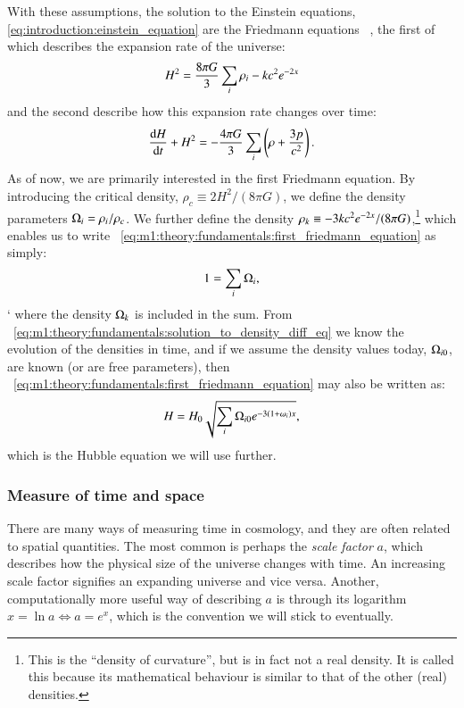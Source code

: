     With these assumptions, the solution to the Einstein equations, \cref{eq:introduction:einstein_equation} are the Friedmann equations ~\cite[ch. 8.3]{carroll_2019}, the first of which describes the expansion rate of the universe:
    \begin{equation}
        \label{eq:m1:theory:fundamentals:first_friedmann_equation}
        H^2 = \frac{8\pi G}{3}\sum_i\rho_i - kc^2e^{-2x} \\
    \end{equation}
    and the second describe how this expansion rate changes over time:
    \begin{equation}
        \label{eq:m1:theory:fundamentals:second_friedmann_equation}
        \dv{H}{t}+H^2 = -\frac{4\pi G}{3}\sum_i\left(\rho+\frac{3p}{c^2}\right).
    \end{equation}
    As of now, we are primarily interested in the first Friedmann equation. By introducing the critical density, $\rho_c\equiv2H^2/(8\pi G)$, we define the density parameters $\Omega_i=\rho_i/\rho_c$. We further define the density $\rho_k\equiv-3kc^2e^{-2x}/(8\pi G)$,\footnote{This is the ``density of curvature'', but is in fact not a real density. It is called this because its mathematical behaviour is similar to that of the other (real) densities.} which enables us to write ~\cref{eq:m1:theory:fundamentals:first_friedmann_equation} as simply:
    \begin{equation}
        1=\sum_i\Omega_i,
    \end{equation}`
    where the density $\Omega_k$ is included in the sum. From ~\cref{eq:m1:theory:fundamentals:solution_to_density_diff_eq} we know the evolution of the densities in time, and if we assume the density values today, $\Omega_{i0}$, are known (or are free parameters), then ~\cref{eq:m1:theory:fundamentals:first_friedmann_equation} may also be written as:
    \begin{equation}\label{eq:m1:theory:fundamentals:Hubble_equation}
        H = H_0\sqrt{\sum_i\Omega_{i0}e^{-3(1+\omega_i)x}},
    \end{equation}
    which is the Hubble equation we will use further.


\subsubsection{Measure of time and space}\label{sec:m1:measure_time_space}
    There are many ways of measuring time in cosmology, and they are often related to spatial quantities. The most common is perhaps the \textit{scale factor} $a$, which describes how the physical size of the universe changes with time. An increasing scale factor signifies an expanding universe and vice versa. Another, computationally more useful way of describing $a$ is through its logarithm $x=\ln a \iff a=e^x$, which is the convention we will stick to eventually.
    

